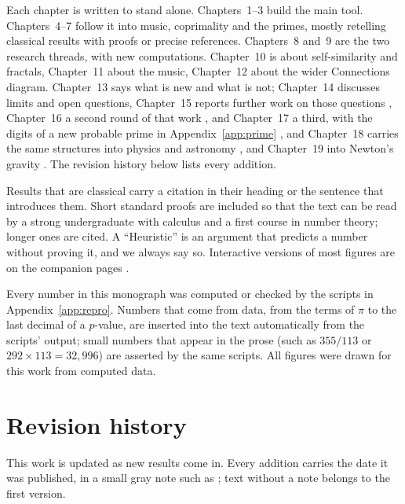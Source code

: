 Each chapter is written to stand alone. Chapters~1--3 build the main tool. Chapters~4--7 follow it into music, coprimality and the primes, mostly retelling classical results with proofs or precise references. Chapters~8 and~9 are the two research threads, with new computations. Chapter~10 is about self-similarity and fractals, Chapter~11 about the music, Chapter~12 about the wider Connections diagram. Chapter~13 says what is new and what is not; Chapter~14 discusses limits and open questions, Chapter~15 reports further work on those questions \addedon{\revA}, Chapter~16 a second round of that work \addedon{\revB}, and Chapter~17 a third, with the digits of a new probable prime in Appendix~\ref{app:prime} \addedon{\revC}, and Chapter~18 carries the same structures into physics and astronomy \addedon{\revD}, and Chapter~19 into Newton's gravity \addedon{\revF}. The revision history below lists every addition.

Results that are classical carry a citation in their heading or the sentence that introduces them. Short standard proofs are included so that the text can be read by a strong undergraduate with calculus and a first course in number theory; longer ones are cited. A ``Heuristic'' is an argument that predicts a number without proving it, and we always say so. Interactive versions of most figures are on the companion pages \citep{RhythmSite,ConnectionsSite}.

Every number in this monograph was computed or checked by the scripts in Appendix~\ref{app:repro}. Numbers that come from data, from the terms of $\pi$ to the last decimal of a $p$-value, are inserted into the text automatically from the scripts' output; small numbers that appear in the prose (such as $355/113$ or $292 \times 113 = 32{,}996$) are asserted by the same scripts. All figures were drawn for this work from computed data.

\chapter*{Revision history}

This work is updated as new results come in. Every addition carries the date it was published, in a small gray note such as \addedon{\revB}; text without a note belongs to the first version.

